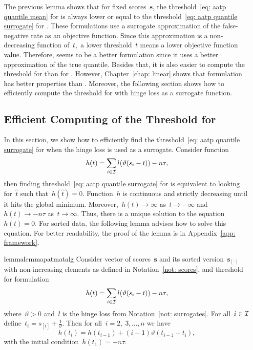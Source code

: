 The previous lemma shows that for fixed scores~$\bm{s}$, the threshold~\eqref{eq: aatp quantile mean} for \TopPushK is always lower or equal to the threshold~\eqref{eq: aatp quantile surrogate} for \PatMat. These formulations use a surrogate approximation of the false-negative rate as an objective function. Since this approximation is a non-decreasing function of~$t,$ a lower threshold~$t$ means a lower objective function value. Therefore, \TopPushK seems to be a better formulation since it uses a better approximation of the true quantile. Besides that, it is also easier to compute the threshold for \TopMeanK than for \PatMat. However, Chapter~\ref{chap: linear} shows that \PatMat formulation has better properties than \TopMeanK. Moreover, the following section shows how to efficiently compute the threshold for \PatMat with hinge loss as a surrogate function.

\subsection{Efficient Computing of the Threshold for \PatMat}\label{sec: patmat threshold alg}

In this section, we show how to efficiently find the threshold~\eqref{eq: aatp quantile surrogate} for \PatMat when the hinge loss is used as a surrogate. Consider function
\begin{equation*}
  h(t) = \sum_{i \in \I} l\Brac{\vartheta(s_i - t)} - n\tau,
\end{equation*}
then finding threshold~\eqref{eq: aatp quantile surrogate} for \PatMat is equivalent to looking for~$\hat{t}$ such that~$h(\hat{t}) = 0$. Function~$h$ is continuous and strictly decreasing until it hits the global minimum. Moreover,~$h(t) \to \infty$ as~$t \to -\infty$ and~$h(t) \to -n\tau$ as~$t \to \infty$. Thus, there is a unique solution to the equation~$h(t) = 0$. For sorted data, the following lemma advises how to solve this equation. For better readability, the proof of the lemma is in Appendix~\ref{app: framework}.

\begin{restatable}{lemma}{lemmapatmatalg}\label{lemma: patmat threshold algorithm}
  Consider vector of scores~$\bm{s}$ and its sorted version~$\bm{s}_{[\cdot]}$ with non-increasing elements as defined in Notation~\ref{not: scores}, and threshold for \PatMat formulation 
  \begin{equation}\label{eq: patmat h}
    h(t) = \sum_{i \in \I} l\Brac{\vartheta(s_i - t)} - n\tau,
  \end{equation}
  where~$\vartheta > 0$ and~$l$ is the hinge loss from Notation~\ref{not: surrogates}. For all~$i \in \mathcal{I}$ define~$t_i = s_{[i]} + \frac{1}{\vartheta}.$ Then for all~$i = 2, \; 3, \ldots, n$ we have
  \begin{equation}\label{eq:update_h}
    h(t_i)
      = h(t_{i - 1}) + (i - 1) \vartheta(t_{i - 1} - t_{i}),
  \end{equation}
  with the initial condition~$h(t_{1}) = -n\tau.$
\end{restatable}

